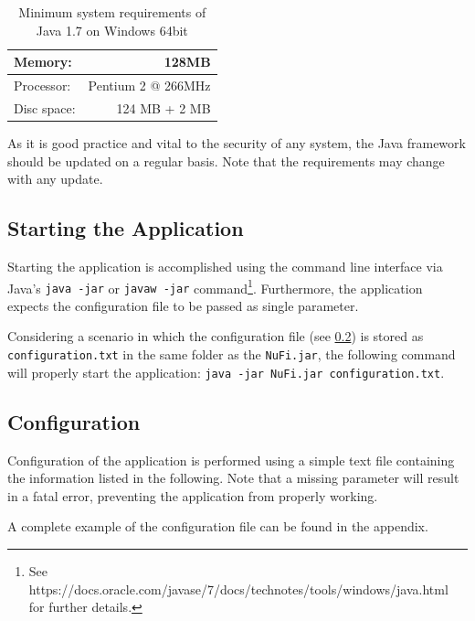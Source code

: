 \documentclass[a4paper, 12pt, twoside]{article}
\newcommand{\code}[1]{\colorbox{codegray}{\texttt{#1}}}
\begin{document}
\begin{table}[h]
\centering
\begin{tabular}{ l | r }
Memory: & 128MB \\
\hline
Processor: & Pentium 2 @ 266MHz \\
\hline
Disc space: & 124 MB + 2 MB \\
\end{tabular}
\caption{Minimum system requirements of Java 1.7 on Windows 64bit}
\label{tab:system_requirements_java7}
\end{table}

As it is good practice and vital to the security of any system, the Java
framework should be updated on a regular basis. Note that the requirements may
change with any update.

\subsection{Starting the Application}
Starting the application is accomplished using the command line interface via
Java's \code{java -jar} or \code{javaw -jar} command\footnote{See
https://docs.oracle.com/javase/7/docs/technotes/tools/windows/java.html for
further details.}. Furthermore, the application expects the configuration file
to be passed as single parameter.

Considering a scenario in which the configuration file (see \ref{sec:configuration}) is
stored as \code{configuration.txt} in the same folder as the \code{NuFi.jar}, the
following command will properly start the application:
\newline\code{java -jar NuFi.jar configuration.txt}.


\subsection{Configuration}\label{sec:configuration}
Configuration of the application is performed using a simple text file
containing the information listed in the following. Note that a missing
parameter will result in a fatal error, preventing the application from properly
working.

A complete example of the configuration file can be found in the appendix.
\end{document}
